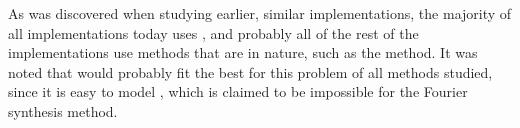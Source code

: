 As was discovered when studying earlier, similar implementations, the majority of all implementations today uses , and probably all of the rest of the implementations use methods that are  in nature, such as the \LPD method. It was noted that \LPD would probably fit the best for this problem of all methods studied, since it is easy to model \FSI, which is claimed to be impossible for the Fourier synthesis method.